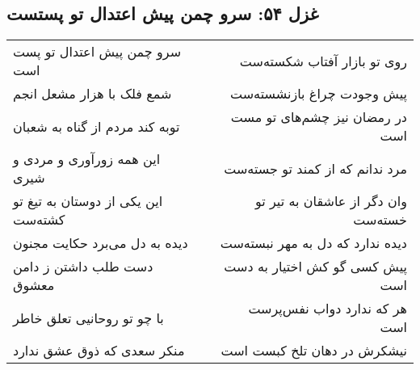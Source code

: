 \begin{center}
\section*{غزل ۵۴: سرو چمن پیش اعتدال تو پستست}
\label{sec:054}
\begin{longtable}{l p{0.5cm} r}
سرو چمن پیش اعتدال تو پست است
&&
روی تو بازار آفتاب شکسته‌ست
\\
شمع فلک با هزار مشعل انجم
&&
پیش وجودت چراغ بازنشسته‌ست
\\
توبه کند مردم از گناه به شعبان
&&
در رمضان نیز چشم‌های تو مست است
\\
این همه زورآوری و مردی و شیری
&&
مرد ندانم که از کمند تو جسته‌ست
\\
این یکی از دوستان به تیغ تو کشته‌ست
&&
وان دگر از عاشقان به تیر تو خسته‌ست
\\
دیده به دل می‌برد حکایت مجنون
&&
دیده ندارد که دل به مهر نبسته‌ست
\\
دست طلب داشتن ز دامن معشوق
&&
پیش کسی گو کش اختیار به دست است
\\
با چو تو روحانیی تعلق خاطر
&&
هر که ندارد دواب نفس‌پرست است
\\
منکر سعدی که ذوق عشق ندارد
&&
نیشکرش در دهان تلخ کبست است
\\
\end{longtable}
\end{center}
